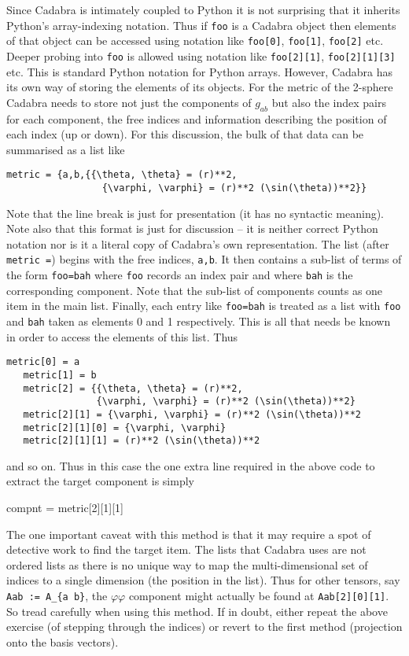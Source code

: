 \documentclass[a4paper,12pt]{article}
\numberwithin{equation}{section}%
\begin{document}
Since Cadabra is intimately coupled to Python it is not surprising that it inherits Python's
array-indexing notation. Thus if \verb|foo| is a Cadabra object then elements of that object
can be accessed using notation like \verb|foo[0]|, \verb|foo[1]|, \verb|foo[2]| etc. Deeper
probing into \verb|foo| is allowed using notation like \verb|foo[2][1]|, \verb|foo[2][1][3]|
etc. This is standard Python notation for Python arrays. However, Cadabra has its own way of
storing the elements of its objects. For the metric of the 2-sphere Cadabra needs to store
not just the components of $g_{a b}$ but also the index pairs for each component, the free
indices and information describing the position of each index (up or down). For this
discussion, the bulk of that data can be summarised as a list like
\begin{lstlisting}[numbers=none]
  metric = {a,b,{{\theta, \theta} = (r)**2,
                 {\varphi, \varphi} = (r)**2 (\sin(\theta))**2}}
\end{lstlisting}
Note that the line break is just for presentation (it has no syntactic meaning). Note also
that this format is just for discussion -- it is neither correct Python notation nor is it a
literal copy of Cadabra's own representation. The list (after \verb|metric =|) begins with
the free indices, \verb|a,b|. It then contains a sub-list of terms of the form
\verb|foo=bah| where \verb|foo| records an index pair and where \verb|bah| is the
corresponding component. Note that the sub-list of components counts as one item in the main
list. Finally, each entry like \verb|foo=bah| is treated as a list with \verb|foo| and
\verb|bah| taken as elements 0 and 1 respectively. This is all that needs be known in order
to access the elements of this list. Thus
\begin{lstlisting}[numbers=none]
   metric[0] = a
   metric[1] = b
   metric[2] = {{\theta, \theta} = (r)**2,
                {\varphi, \varphi} = (r)**2 (\sin(\theta))**2}
   metric[2][1] = {\varphi, \varphi} = (r)**2 (\sin(\theta))**2
   metric[2][1][0] = {\varphi, \varphi}
   metric[2][1][1] = (r)**2 (\sin(\theta))**2
\end{lstlisting}
and so on. Thus in this case the one extra line required in the above code to extract
the target component is simply
\bgroup
\lstset{firstnumber=last}
\begin{cadabra}
   compnt = metric[2][1][1]
\end{cadabra}
\egroup
The one important caveat with this method is that it may require a spot of detective work to
find the target item. The lists that Cadabra uses are not ordered lists as there is no unique
way to map the multi-dimensional set of indices to a single dimension (the position in the
list). Thus for other tensors, say \verb|Aab := A_{a b}|, the $\varphi\varphi$ component
might actually be found at \verb|Aab[2][0][1]|. So tread carefully when using this method. If
in doubt, either repeat the above exercise (of stepping through the indices) or revert to the
first method (projection onto the basis vectors).
\end{document}
